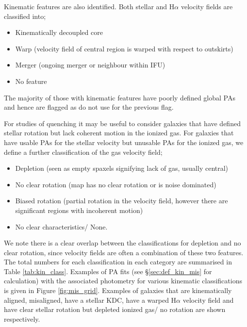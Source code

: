 \documentclass[fleqn,usenatbib]{mnras}
\begin{document}
Kinematic features are also identified. Both stellar and H$\alpha$ velocity fields are classified into;
\begin{itemize}
    \item Kinematically decoupled core
    \item Warp (velocity field of central region is warped with respect to outskirts)
    \item Merger (ongoing merger or neighbour within IFU)
    \item No feature
\end{itemize}
The majority of those with kinematic features have poorly defined global PAs and hence are flagged as do not use for the previous flag. 

For studies of quenching it may be useful to consider galaxies that have defined stellar rotation but lack coherent motion in the ionized gas. For galaxies that have usable PAs for the stellar velocity but unusable PAs for the ionized gas, we define a further classification of the gas velocity field;
\begin{itemize}
    \item Depletion (seen as empty spaxels signifying lack of gas, usually central)
    \item No clear rotation (map has no clear rotation or is noise dominated)
    \item Biased rotation (partial rotation in the velocity field, however there are significant regions with incoherent motion)
    \item No clear characteristics/ None.
\end{itemize}
We note there is a clear overlap between the classifications for depletion and no clear rotation, since velocity fields are often a combination of these two features. The total numbers for each classification in each category are summarised in Table \ref{tab:kin_class}. Examples of PA fits (see \S\ref{sec:def_kin_mis} for calculation) with the associated photometry for various kinematic classifications is given in Figure \ref{fig:mis_grid}. Examples of galaxies that are kinematically aligned, misaligned, have a stellar KDC, have a warped H$\alpha$ velocity field and have clear stellar rotation but depleted ionized gas/ no rotation are shown respectively. 
\end{document}
